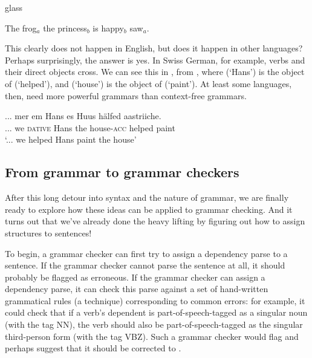 \begin{tblsfilledsymbol}{}{glass}
\begin{underthehood}
  \ea \label{ex:frog2-prime} The frog$_a$ the princess$_b$ is happy$_b$
  saw$_a$.
  \z 

This clearly does not happen in English, but does it happen in other
languages?  Perhaps surprisingly, the answer is yes.  In Swiss German,
for example, verbs and their direct objects cross.  We can see this in
 , from \citet{Shieber:1985}, where  (`Hans') is the object
of  (`helped'), and  (`house') is the
object of  (`paint').  At least some languages, then,
need more powerful grammars than context-free grammars.

\ea \label{ex:hans}\gll ... mer em Hans es Huus h\"{a}lfed
  aastriiche.\\
  ... we \textsc{dative} Hans the house-\textsc{acc} helped paint \\
  \glt `... we helped Hans paint the house'
\z 

\end{underthehood}
\end{tblsfilledsymbol}





\subsection{From grammar to grammar checkers}
\label{sec:grammar-checking}

After this long detour into syntax and the nature of grammar, we are finally ready to explore how these ideas can be applied to grammar checking. And it turns out that we've already done the heavy lifting by figuring out how to assign structures to sentences!

To begin, a grammar checker can first try to assign a dependency parse to a sentence.  If the grammar checker cannot parse the sentence at all, it should probably be flagged as erroneous.  If the grammar checker can assign a dependency parse, it can check this parse against a set of hand-written grammatical rules (a  technique) corresponding to common errors: for example, it could check that if a verb's  dependent is part-of-speech-tagged as a singular noun (with the tag NN), the verb should also be part-of-speech-tagged as the singular third-person form (with the tag VBZ). Such a grammar checker would flag  and perhaps suggest that it should be corrected to . 

